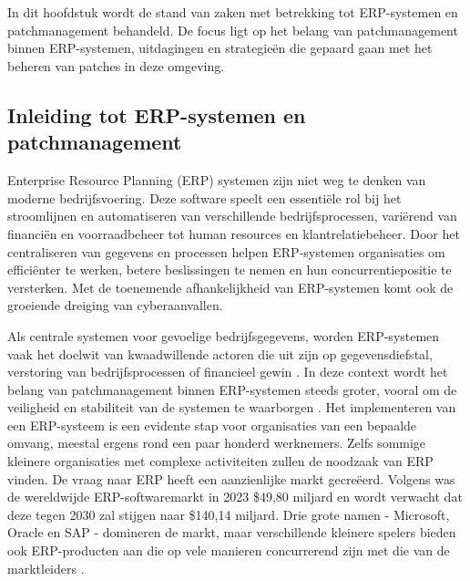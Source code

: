 \chapter{}
\label{ch:stand-van-zaken}


In dit hoofdstuk wordt de stand van zaken met betrekking tot ERP-systemen en patchmanagement behandeld. De focus ligt op het belang van patchmanagement binnen ERP-systemen, uitdagingen en strategieën die gepaard gaan met het beheren van patches in deze omgeving.

\section{Inleiding tot ERP-systemen en patchmanagement}
Enterprise Resource Planning (ERP) systemen zijn niet weg te denken van moderne bedrijfsvoering. Deze software speelt een essentiële rol bij het stroomlijnen en automatiseren van verschillende bedrijfsprocessen, variërend van financiën en voorraadbeheer tot human resources en klantrelatiebeheer.
Door het centraliseren van gegevens en processen helpen ERP-systemen organisaties om efficiënter te werken, betere beslissingen te nemen en hun concurrentiepositie te versterken. Met de toenemende afhankelijkheid van ERP-systemen komt ook de groeiende dreiging van cyberaanvallen. 

Als centrale systemen voor gevoelige bedrijfsgegevens, worden ERP-systemen vaak het doelwit van
kwaadwillende actoren die uit zijn op gegevensdiefstal, verstoring van bedrijfsprocessen of financieel gewin \autocite{Dekker2022}. In deze context wordt het belang van patchmanagement binnen ERP-systemen steeds groter, vooral om de veiligheid en stabiliteit van de systemen te waarborgen \autocite{Pearson2024}.
Het implementeren van een ERP-systeem is een evidente stap voor organisaties van een bepaalde omvang, meestal ergens rond een paar honderd werknemers. Zelfs sommige kleinere organisaties met complexe activiteiten zullen de noodzaak van ERP vinden. De vraag
naar ERP heeft een aanzienlijke markt gecreëerd. Volgens \textcite{Madh2024} was de wereldwijde ERP-softwaremarkt in 2023 \$49,80 miljard en wordt verwacht dat deze tegen 2030 zal stijgen naar \$140,14 miljard. Drie grote namen -
Microsoft, Oracle en SAP - domineren de markt, maar verschillende kleinere spelers bieden ook ERP-producten aan die op vele manieren concurrerend zijn met die van de marktleiders \autocite{Pratt2023}.

